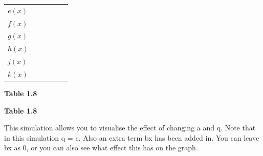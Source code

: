 \begin{table}[H]
\begin{center}
\begin{xtabular}[t]{|l|l|l|l|l|l|}
                  $e\left(x\right)$
                 &
         &
         &
         &
         &
     \tabularnewline{}
                  $f\left(x\right)$
                 &
         &
         &
         &
         &
     \tabularnewline{}
                  $g\left(x\right)$
                 &
         &
         &
         &
         &
     \tabularnewline{}
                  $h\left(x\right)$
                 &
         &
         &
         &
         &
     \tabularnewline{}
                  $j\left(x\right)$
                 &
         &
         &
         &
         &
     \tabularnewline{}
                  $k\left(x\right)$
                 &
         &
         &
         &
         &
     \tabularnewline{}
    \end{xtabular}
      \end{center}
    \begin{center}{\small\bfseries Table 1.8}\end{center}
    \begin{caption}{\small\bfseries Table 1.8}\end{caption}
\end{table}
    \par
        \label{m39345*eip-679}This simulation allows you to visualise the effect of changing a and q. Note that in this simulation q = c. Also an extra term bx has been added in. You can leave bx as 0, or you can also see what effect this has on the graph.
\par \label{m39345*eip-481}

